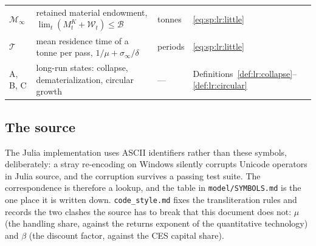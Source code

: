 \begin{center}
\begin{tabular}{llll}
$\mathcal M_\infty$ & retained material endowment, $\lim_t\left(M^K_t+\mathcal W_t\right)\le\mathcal B$ & tonnes & \eqref{eq:sp:lr:little}\\
$\mathcal T$ & mean residence time of a tonne per pass, $1/\mu+\sigma_\infty/\delta$ & periods & \eqref{eq:sp:lr:little}\\
A, B, C & long-run states: collapse, dematerialization, circular growth & --- & Definitions~\ref{def:lr:collapse}--\ref{def:lr:circular}\\
\hline
\end{tabular}
\end{center}

\subsection{The source}\label{sec:app:notation:source}

The Julia implementation uses ASCII identifiers rather than these symbols, deliberately: a stray
re-encoding on Windows silently corrupts Unicode operators in Julia source, and the corruption survives
a passing test suite. The correspondence is therefore a lookup, and the table in
\texttt{model/SYMBOLS.md} is the one place it is written down. \texttt{code\_style.md} fixes the
transliteration rules and records the two clashes the source has to break that this document does not:
$\mu$ (the handling share, against the returns exponent of the quantitative technology) and $\beta$
(the discount factor, against the CES capital share).
